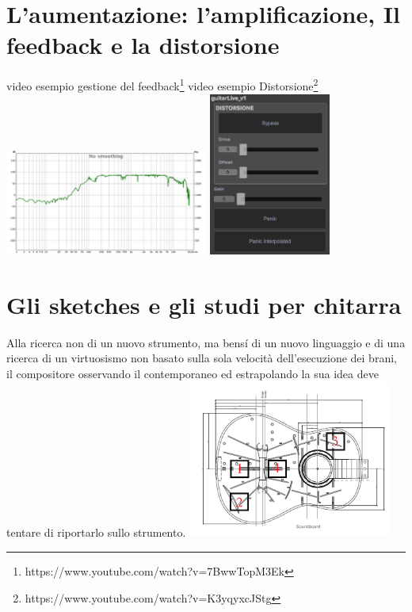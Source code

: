 \documentclass[oneside]{article}
\begin{document}
\begin{multicols*}{2}
\begin{center}
 \end{center}
 



\section{L’aumentazione: l'amplificazione, Il feedback e la distorsione}

video esempio gestione del feedback\footnote{https://www.youtube.com/watch?v=7BwwTopM3Ek}
video esempio Distorsione\footnote{https://www.youtube.com/watch?v=K3yqyxcJStg}
\includegraphics[width=0.5\textwidth]{img/ir.png}
\includegraphics[width=0.3\textwidth]{img/guitarLive.png}


\section{Gli sketches e gli studi per chitarra}

Alla ricerca non di un nuovo strumento, ma bensí di un nuovo linguaggio e di una ricerca di un virtuosismo non basato sulla sola velocità dell’esecuzione dei brani, il compositore osservando il contemporaneo ed estrapolando la sua idea deve tentare di riportarlo sullo strumento.
\includegraphics[width=0.5\textwidth]{img/luoghi_perc.png}


\end{multicols*}
\end{document}
